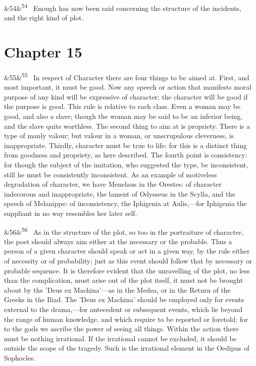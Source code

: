\documentclass[12pt]{article}
\newcommand{\para}[1][]{\par\noindent\ifx&#1&\else\textsuperscript{\footnotesize #1}~\fi}
\begin{document}
\para[54] Enough has now been said concerning the structure of the incidents, and the right kind of plot.

\section*{Chapter 15}

\para[55] In respect of Character there are four things to be aimed at. First, and most important, it must be good. Now any speech or action that manifests moral purpose of any kind will be expressive of character: the character will be good if the purpose is good. This rule is relative to each class. Even a woman may be good, and also a slave; though the woman may be said to be an inferior being, and the slave quite worthless. The second thing to aim at is propriety. There is a type of manly valour; but valour in a woman, or unscrupulous cleverness, is inappropriate. Thirdly, character must be true to life: for this is a distinct thing from goodness and propriety, as here described. The fourth point is consistency: for though the subject of the imitation, who suggested the type, be inconsistent, still he must be consistently inconsistent. As an example of motiveless degradation of character, we have Menelaus in the Orestes: of character indecorous and inappropriate, the lament of Odysseus in the Scylla, and the speech of Melanippe: of inconsistency, the Iphigenia at Aulis,---for Iphigenia the suppliant in no way resembles her later self.

\para[56] As in the structure of the plot, so too in the portraiture of character, the poet should always aim either at the necessary or the probable. Thus a person of a given character should speak or act in a given way, by the rule either of necessity or of probability; just as this event should follow that by necessary or probable sequence. It is therefore evident that the unravelling of the plot, no less than the complication, must arise out of the plot itself, it must not be brought about by the 'Deus ex Machina'---as in the Medea, or in the Return of the Greeks in the Iliad. The 'Deus ex Machina' should be employed only for events external to the drama,---for antecedent or subsequent events, which lie beyond the range of human knowledge, and which require to be reported or foretold; for to the gods we ascribe the power of seeing all things. Within the action there must be nothing irrational. If the irrational cannot be excluded, it should be outside the scope of the tragedy. Such is the irrational element in the Oedipus of Sophocles.
\end{document}
